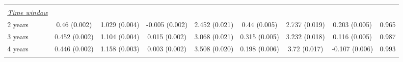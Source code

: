 \begin{tabular}{@{\extracolsep{5pt}} l cccccccc}
 &   &   &   &   &   &   &   &  \\ 
\underline{{\it Time window}} &   &   &   &   &   &   &   &  \\ 
2 years & 0.46 (0.002) & 1.029 (0.004) & -0.005 (0.002) & 2.452 (0.021) & 0.44 (0.005) & 2.737 (0.019) & 0.203 (0.005) & 0.965 \\ 
3 years & 0.452 (0.002) & 1.104 (0.004) & 0.015 (0.002) & 3.068 (0.021) & 0.315 (0.005) & 3.232 (0.018) & 0.116 (0.005) & 0.987 \\ 
4 years & 0.446 (0.002) & 1.158 (0.003) & 0.003 (0.002) & 3.508 (0.020) & 0.198 (0.006) & 3.72 (0.017) & -0.107 (0.006) & 0.993 \\ 
\hline \\[-1.8ex] 
\end{tabular} 
